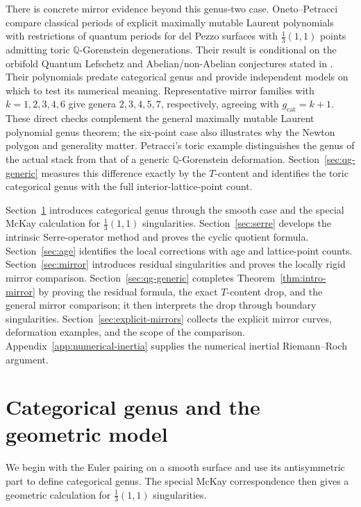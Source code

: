 \documentclass[11pt]{article}
\theoremstyle{plain}
\theoremstyle{definition}
\theoremstyle{remark}
\newcommand{\Q}{\mathbb Q}
\newcommand{\1}{\mathbf 1}
\begin{document}
There is concrete mirror evidence beyond this genus-two case.  Oneto--Petracci \cite[Theorem 2.2]{OP} compare classical periods of explicit maximally mutable Laurent polynomials with restrictions of quantum periods for del Pezzo surfaces with $\frac13(1,1)$ points admitting toric $\Q$-Gorenstein degenerations.  Their result is conditional on the orbifold Quantum Lefschetz and Abelian/non-Abelian conjectures stated in \cite[Conjectures 5.2 and 6.1]{OP}.  Their polynomials predate categorical genus and provide independent models on which to test its numerical meaning.  Representative mirror families with $k=1,2,3,4,6$ give genera $2,3,4,5,7$, respectively, agreeing with $g_{\mathrm{cat}}=k+1$.  These direct checks complement the general maximally mutable Laurent polynomial genus theorem; the six-point case also illustrates why the Newton polygon and generality matter.  Petracci's toric example \cite{PetracciKmoduli} distinguishes the genus of the actual stack from that of a generic $\Q$-Gorenstein deformation.  Section~\ref{sec:qg-generic} measures this difference exactly by the $T$-content and identifies the toric categorical genus with the full interior-lattice-point count.

Section~\ref{sec:categorical} introduces categorical genus through the smooth case and the special McKay calculation for $\frac13(1,1)$ singularities.  Section~\ref{sec:serre} develops the intrinsic Serre-operator method and proves the cyclic quotient formula.  Section~\ref{sec:age} identifies the local corrections with age and lattice-point counts.  Section~\ref{sec:mirror} introduces residual singularities and proves the locally rigid mirror comparison.  Section~\ref{sec:qg-generic} completes Theorem~\ref{thm:intro-mirror} by proving the residual formula, the exact $T$-content drop, and the general mirror comparison; it then interprets the drop through boundary singularities.  Section~\ref{sec:explicit-mirrors} collects the explicit mirror curves, deformation examples, and the scope of the comparison.  Appendix~\ref{app:numerical-inertia} supplies the numerical inertial Riemann--Roch argument.

\section{Categorical genus and the geometric model}\label{sec:categorical}

We begin with the Euler pairing on a smooth surface and use its antisymmetric part to define categorical genus.  The special McKay correspondence then gives a geometric calculation for $\frac13(1,1)$ singularities.
\end{document}

